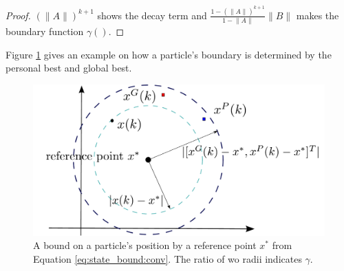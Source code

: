 \begin{mythm}
\begin{proof}

$ ( \lVert A \rVert )^{k+1} $ shows the decay term and $ \frac{1 - ( \lVert A \rVert )^{k+1} }{1 - \lVert A \rVert }  \lVert B \rVert $ makes the boundary function $ \gamma () $.

\end{proof}
\end{mythm}

Figure \ref{fig:boundary} gives an example on how a particle's boundary is determined by the personal best and global best.

\begin{figure}
\centering
\includegraphics[width=0.6\linewidth]{./fig/boundary}
\caption{A bound on a particle's position by a reference point $ x^{*} $ from Equation \ref{eq:state_bound:conv}.
The ratio of wo radii indicates $ \gamma $.}
\label{fig:boundary}
\end{figure}

